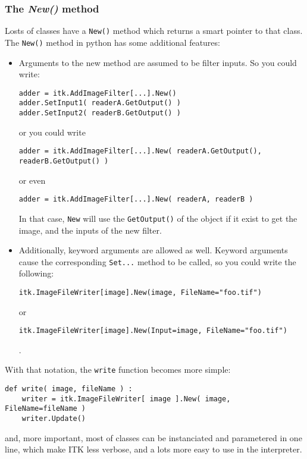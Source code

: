 \documentclass{InsightArticle}
\begin{document}
     \subsubsection{The {\em New()} method}

Losts of classes have a \verb$New()$ method which returns a smart pointer to that class. The
\verb$New()$ method in python has some additional features:
\begin{itemize}
  \item Arguments to the new method are assumed to be filter inputs. So you could
write:
\begin{verbatim}
adder = itk.AddImageFilter[...].New()
adder.SetInput1( readerA.GetOutput() )
adder.SetInput2( readerB.GetOutput() )
\end{verbatim}
or you could write
\begin{verbatim}
adder = itk.AddImageFilter[...].New( readerA.GetOutput(), readerB.GetOutput() )
\end{verbatim}
or even
\begin{verbatim}
adder = itk.AddImageFilter[...].New( readerA, readerB )
\end{verbatim}
In that case, \verb$New$ will use the \verb$GetOutput()$ of the object if it
exist to get the image, and the inputs of the new filter.

  \item Additionally, keyword arguments are allowed as well. Keyword arguments cause
the corresponding \verb$Set...$ method to be called, so you could write the
following:
\begin{verbatim}
itk.ImageFileWriter[image].New(image, FileName="foo.tif")
\end{verbatim}
or
\begin{verbatim}
itk.ImageFileWriter[image].New(Input=image, FileName="foo.tif")
\end{verbatim}.

\end{itemize}

With that notation, the \verb$write$ function becomes more simple:
\begin{verbatim}
def write( image, fileName ) :
    writer = itk.ImageFileWriter[ image ].New( image, FileName=fileName )
    writer.Update()
\end{verbatim}

and, more important, most of classes can be instanciated and parametered in one line,
which make ITK less verbose, and a lots more easy to use in the interpreter.
\end{document}
